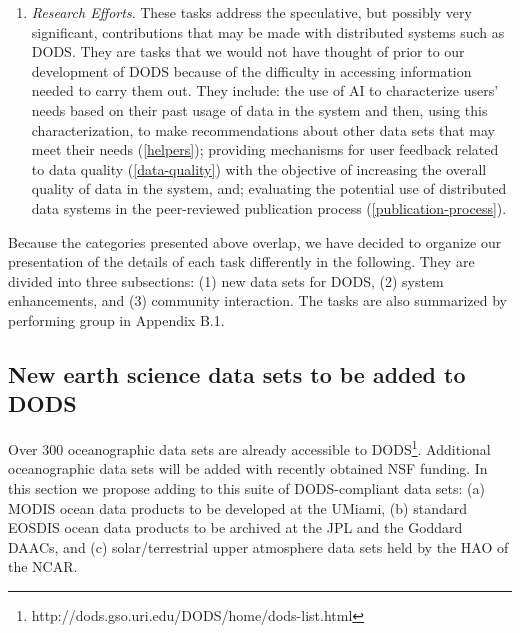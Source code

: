 \documentclass[12pt]{article}
\begin{document}
\begin{enumerate}
\item \emph{Research Efforts}. These tasks address the speculative,
but possibly very significant, contributions that may be made with
distributed systems such as \ac{DODS}. They are tasks that we would
not have thought of prior to our development of \ac{DODS} because of the
difficulty in accessing information needed to carry them out. 
They include: the use of \acl{AI} to characterize users' needs based on 
their past usage of data in the system and then, using this
characterization, to make recommendations about other data sets that 
may meet their needs (\ref{helpers}); providing mechanisms for user 
feedback related to data quality (\ref{data-quality}) with the objective
of increasing the overall quality of data in the system, and; 
evaluating the potential use of distributed data systems in the 
peer-reviewed publication process (\ref{publication-process}).
\end{enumerate}

Because the categories presented above overlap, we have decided to
organize our presentation of the details of each task differently in
the following. They are divided into three subsections: (1) new 
data sets for \ac{DODS}, (2) system enhancements, and (3) community 
interaction. The tasks are also summarized by performing group in 
Appendix B.1.

\subsection{New earth science data sets to be added to \ac{DODS}}
\label{new-data}

Over 300 oceanographic data sets are already accessible to 
\ac{DODS}\footnote{
http://dods.gso.uri.edu/DODS/home/dods-list.html}.
Additional oceanographic data sets will be added with recently 
obtained \ac{NSF} funding. In this section we propose adding to 
this suite of \ac{DODS}-compliant data sets: (a) \acs{MODIS} ocean 
data products to be developed at the \ac{UMiami}, (b) standard 
\acs{EOSDIS} ocean data products to be archived at the \ac{JPL} 
and the Goddard \ac{DAAC}s, and (c) solar/terrestrial upper atmosphere 
data sets held by the \ac{HAO} of the \ac{NCAR}. 
\end{document}

